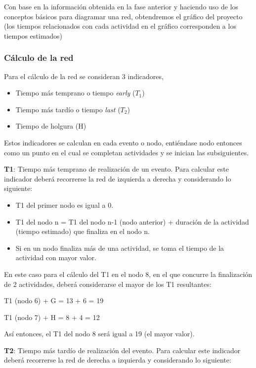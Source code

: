\documentclass{mylib/reporteCorto}
\begin{document}
Con base en la información obtenida en la fase anterior y haciendo uso de los conceptos básicos para diagramar una red, obtendremos el gráfico del proyecto (los tiempos relacionados con cada actividad en el gráfico corresponden a los tiempos estimados)


\subsubsection{Cálculo de la red}

Para el cálculo de la red se consideran 3 indicadores,

\begin{itemize}
	\item Tiempo más temprano o tiempo \textit{early} ($T_1$)
	\item Tiempo más tardío o tiempo \textit{last} ($T_2$)
	\item Tiempo de holgura (H)
\end{itemize}

\noindent

Estos indicadores se calculan en cada evento o nodo, entiéndase nodo entonces como un punto en el cual se completan actividades y se inician las subsiguientes.

\textbf{T1}: Tiempo más temprano de realización de un evento. Para calcular este indicador deberá recorrerse la red de izquierda a derecha y considerando lo siguiente:
\begin{itemize}
	\item T1 del primer nodo es igual a 0.
	\item T1 del nodo n = T1 del nodo n-1 (nodo anterior) + duración de la actividad (tiempo estimado) que finaliza en el nodo n.
	\item Si en un nodo finaliza más de una actividad, se toma el tiempo de la actividad con mayor valor.
\end{itemize}

En este caso para el cálculo del T1 en el nodo 8, en el que concurre la finalización de 2 actividades, deberá considerarse el mayor de los T1 resultantes:

T1 (nodo 6) + G = 13 + 6 = 19

T1 (nodo 7) + H = 8 + 4 = 12

Así entonces, el T1 del nodo 8 será igual a 19 (el mayor valor).

\textbf{T2}: Tiempo más tardío de realización del evento. Para calcular este indicador deberá recorrerse la red de derecha a izquierda y considerando lo siguiente:
\end{document}
